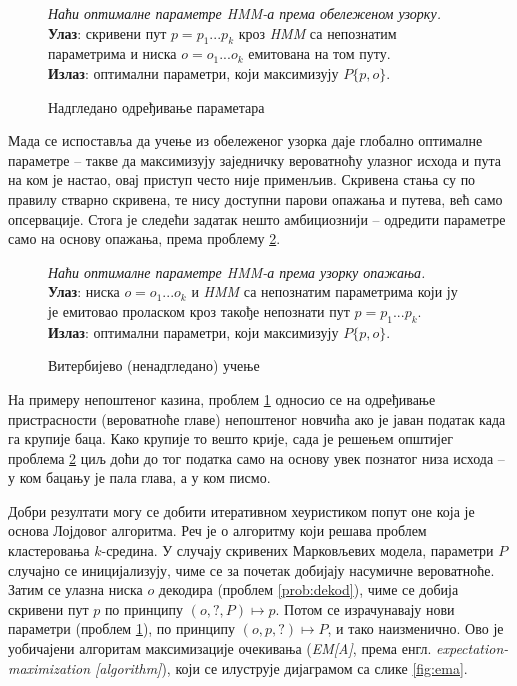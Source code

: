 \documentclass[12pt,oneside]{memoir}
\newenvironment{problem}[1][!ht]
{\renewcommand{\algorithmcfname}{Проблем}
\begin{figure}[!ht]
\centering
  \begin{minipage}{.94\linewidth}
	\begin{algorithm}[#1]%
  }{\end{algorithm}
  \end{minipage}
\end{figure}}
\begin{document}
\begin{CJK}{UTF8}{ipxm}
\begin{problem}[H]
  \SetAlgoLined
  \textit{Наћи оптималне параметре \textit{HMM}-а према обележеном узорку.}\\
  \textbf{Улаз}: скривени пут $p = p_1...p_k$ кроз \textit{HMM} са непознатим параметрима и ниска $o = o_1...o_k$ емитована на том путу.\\
  \textbf{Излаз}: оптимални параметри, који максимизују $P\{p, o\}$.
  \caption{Надгледано одређивање параметара \cite{ba10h}}
  \label{prob:params}
\end{problem}

Мада се испоставља да учење из обележеног узорка даје глобално оптималне параметре -- такве да максимизују заједничку вероватноћу улазног исхода и пута на ком је настао, овај приступ често није применљив. Скривена стања су по правилу стварно скривена, те нису доступни парови опажања и путева, већ само опсервације. Стога је следећи задатак нешто амбициознији -- одредити параметре само на основу опажања, према проблему \ref{prob:vituch}.

\begin{problem}[H]
  \SetAlgoLined
  \textit{Наћи оптималне параметре \textit{HMM}-а према узорку опажања.}\\
  \textbf{Улаз}: ниска $o = o_1...o_k$ и \textit{HMM} са непознатим параметрима који ју је емитовао проласком кроз такође непознати пут $p = p_1...p_k$.\\
  \textbf{Излаз}: оптимални параметри, који максимизују $P\{p, o\}$.
  \caption{Витербијево (ненадгледано) учење \cite{ba10i}}
  \label{prob:vituch}
\end{problem}

На примеру непоштеног казина, проблем \ref{prob:params} односио се на одређивање пристрасности (вероватноће главе) непоштеног новчића ако је јаван податак када га крупије баца. Како крупије то вешто крије, сада је решењем општијег проблема \ref{prob:vituch} циљ доћи до тог податка само на основу увек познатог низа исхода -- у ком бацању је пала глава, а у ком писмо.

Добри резултати могу се добити итеративном хеуристиком попут оне која је основа Лојдовог алгоритма. Реч је о алгоритму који решава проблем кластеровања $k$-средина. У случају скривених Марковљевих модела, параметри $P$ случајно се иницијализују, чиме се за почетак добијају насумичне вероватноће. Затим се улазна ниска $o$ декодира (проблем \ref{prob:dekod}), чиме се добија скривени пут $p$ по принципу $(o, ?, P) \mapsto p$. Потом се израчунавају нови параметри (проблем \ref{prob:params}), по принципу $(o, p, ?) \mapsto P$, и тако наизменично. Ово је уобичајени алгоритам максимизације очекивања (\textit{EM[A]}, према енгл. \textit{expectation-maximization [algorithm]}), који се илуструје дијаграмом са слике \ref{fig:ema}.


\end{CJK}
\end{document}
